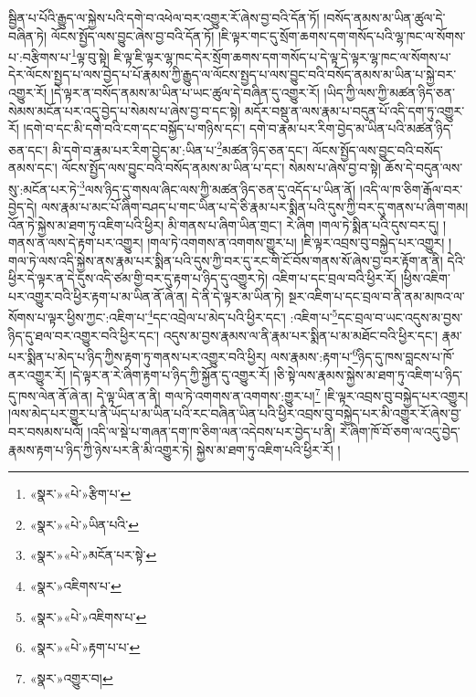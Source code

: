 སྦྱིན་པ་པོའི་རྒྱུད་ལ་སྐྱེས་པའི་དགེ་བ་འཕེལ་བར་འགྱུར་རོ་ཞེས་བྱ་བའི་དོན་ཏོ། །བསོད་ནམས་མ་ཡིན་ཚུལ་དེ་བཞིན་ཏེ། ལོངས་སྤྱོད་ལས་བྱུང་ཞེས་བྱ་བའི་དོན་ཏོ། །ཇི་ལྟར་གང་དུ་སྲོག་ཆགས་དག་གསོད་པའི་ལྷ་ཁང་ལ་སོགས་པ་:བརྩིགས་པ་\footnote{«སྣར་»«པེ་»རྩིག་པ་}ལྟ་བུ་སྟེ། ཇི་ལྟ་ཇི་ལྟར་ལྷ་ཁང་དེར་སྲོག་ཆགས་དག་གསོད་པ་དེ་ལྟ་དེ་ལྟར་ལྷ་ཁང་ལ་སོགས་པ་དེར་ལོངས་སྤྱད་པ་ལས་བྱེད་པ་པོ་རྣམས་ཀྱི་རྒྱུད་ལ་ལོངས་སྤྱད་པ་ལས་བྱུང་བའི་བསོད་ནམས་མ་ཡིན་པ་སྐྱེ་བར་འགྱུར་རོ། །དེ་ལྟར་ན་བསོད་ནམས་མ་ཡིན་པ་ཡང་ཚུལ་དེ་བཞིན་དུ་འགྱུར་རོ། །ཡིད་ཀྱི་ལས་ཀྱི་མཚན་ཉིད་ཅན་སེམས་མངོན་པར་འདུ་བྱེད་པ་སེམས་པ་ཞེས་བྱ་བ་དང་སྟེ། མདོར་བསྡུ་ན་ལས་རྣམ་པ་བདུན་པོ་འདི་དག་ཏུ་འགྱུར་རོ། །དགེ་བ་དང་མི་དགེ་བའི་ངག་དང་བསྐྱོད་པ་གཉིས་དང་། དགེ་བ་རྣམ་པར་རིག་བྱེད་མ་ཡིན་པའི་མཚན་ཉིད་ཅན་དང་། མི་དགེ་བ་རྣམ་པར་རིག་བྱེད་མ་:ཡིན་པ་\footnote{«སྣར་»«པེ་»ཡིན་པའི་}མཚན་ཉིད་ཅན་དང་། ལོངས་སྤྱོད་ལས་བྱུང་བའི་བསོད་ནམས་དང་། ལོངས་སྤྱོད་ལས་བྱུང་བའི་བསོད་ནམས་མ་ཡིན་པ་དང་། སེམས་པ་ཞེས་བྱ་བ་སྟེ། ཆོས་དེ་བདུན་ལས་སུ་:མངོན་པར་ཏེ་\footnote{«སྣར་»«པེ་»མངོན་པར་སྟེ་}ལས་ཉིད་དུ་གསལ་ཞིང་ལས་ཀྱི་མཚན་ཉིད་ཅན་དུ་འདོད་པ་ཡིན་ནོ། །འདི་ལ་ཁ་ཅིག་རྒོལ་བར་བྱེད་དེ། ལས་རྣམ་པ་མང་པོ་ཞིག་བཤད་པ་གང་ཡིན་པ་དེ་ཅི་རྣམ་པར་སྨིན་པའི་དུས་ཀྱི་བར་དུ་གནས་པ་ཞིག་གམ། འོན་ཏེ་སྐྱེས་མ་ཐག་ཏུ་འཇིག་པའི་ཕྱིར། མི་གནས་པ་ཞིག་ཡིན་གྲང་། རེ་ཞིག །གལ་ཏེ་སྨིན་པའི་དུས་བར་དུ། །གནས་ན་ལས་དེ་རྟག་པར་འགྱུར། །གལ་ཏེ་འགགས་ན་འགགས་གྱུར་པ། །ཇི་ལྟར་འབྲས་བུ་བསྐྱེད་པར་འགྱུར། །གལ་ཏེ་ལས་འདི་སྐྱེས་ནས་རྣམ་པར་སྨིན་པའི་དུས་ཀྱི་བར་དུ་རང་གི་ངོ་བོས་གནས་སོ་ཞེས་བྱ་བར་རྟོག་ན་ནི། དེའི་ཕྱིར་དེ་ལྟར་ན་དེ་དུས་འདི་ཙམ་གྱི་བར་དུ་རྟག་པ་ཉིད་དུ་འགྱུར་ཏེ། འཇིག་པ་དང་བྲལ་བའི་ཕྱིར་རོ། །ཕྱིས་འཇིག་པར་འགྱུར་བའི་ཕྱིར་རྟག་པ་མ་ཡིན་ནོ་ཞེ་ན། དེ་ནི་དེ་ལྟར་མ་ཡིན་ཏེ། སྔར་འཇིག་པ་དང་བྲལ་བ་ནི་ནམ་མཁའ་ལ་སོགས་པ་ལྟར་ཕྱིས་ཀྱང་:འཇིག་པ་\footnote{«སྣར་»འཇིགས་པ་}དང་འབྲེལ་པ་མེད་པའི་ཕྱིར་དང་། :འཇིག་པ་\footnote{«སྣར་»«པེ་»འཇིགས་པ་}དང་བྲལ་བ་ཡང་འདུས་མ་བྱས་ཉིད་དུ་ཐལ་བར་འགྱུར་བའི་ཕྱིར་དང་། འདུས་མ་བྱས་རྣམས་ལ་ནི་རྣམ་པར་སྨིན་པ་མ་མཐོང་བའི་ཕྱིར་དང་། རྣམ་པར་སྨིན་པ་མེད་པ་ཉིད་ཀྱིས་རྟག་ཏུ་གནས་པར་འགྱུར་བའི་ཕྱིར། ལས་རྣམས་:རྟག་པ་\footnote{«སྣར་»«པེ་»རྟག་པ་པ་}ཉིད་དུ་ཁས་བླངས་པ་ཁོ་ནར་འགྱུར་རོ། །དེ་ལྟར་ན་རེ་ཞིག་རྟག་པ་ཉིད་ཀྱི་སྐྱོན་དུ་འགྱུར་རོ། །ཅི་སྟེ་ལས་རྣམས་སྐྱེས་མ་ཐག་ཏུ་འཇིག་པ་ཉིད་དུ་ཁས་ལེན་ནོ་ཞེ་ན། དེ་ལྟ་ཡིན་ན་ནི། གལ་ཏེ་འགགས་ན་འགགས་:གྱུར་པ།\footnote{«སྣར་»འགྱུར་བ།} །ཇི་ལྟར་འབྲས་བུ་བསྐྱེད་པར་འགྱུར། །ལས་མེད་པར་གྱུར་པ་ནི་ཡོད་པ་མ་ཡིན་པའི་རང་བཞིན་ཡིན་པའི་ཕྱིར་འབྲས་བུ་བསྐྱེད་པར་མི་འགྱུར་རོ་ཞེས་བྱ་བར་བསམས་པའོ། །འདི་ལ་སྡེ་པ་གཞན་དག་ཁ་ཅིག་ལན་འདེབས་པར་བྱེད་པ་ནི། རེ་ཞིག་ཁོ་བོ་ཅག་ལ་འདུ་བྱེད་རྣམས་རྟག་པ་ཉིད་ཀྱི་ཉེས་པར་ནི་མི་འགྱུར་ཏེ། སྐྱེས་མ་ཐག་ཏུ་འཇིག་པའི་ཕྱིར་རོ། །
